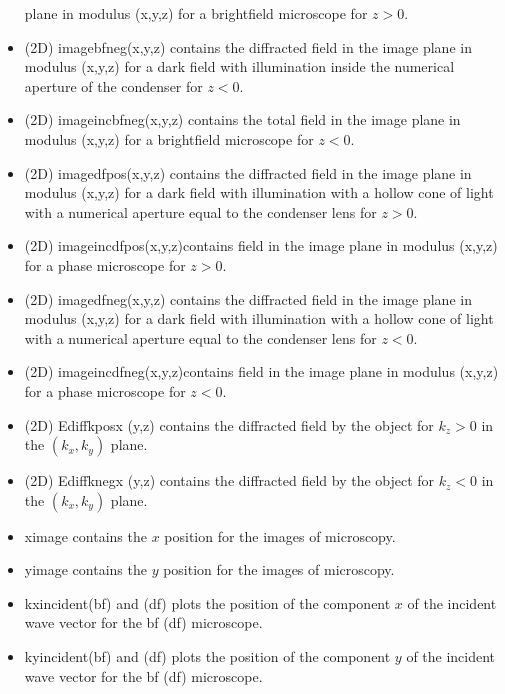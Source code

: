 \begin{itemize}
  plane in modulus (x,y,z) for a brightfield microscope for $z>0$.
\item (2D) imagebfneg(x,y,z) contains the diffracted field in the
  image plane in modulus (x,y,z) for a dark field with illumination
  inside the numerical aperture of the condenser for $z<0$.
\item (2D) imageincbfneg(x,y,z) contains the total field in the image
  plane in modulus (x,y,z) for a brightfield microscope for $z<0$.
\item (2D) imagedfpos(x,y,z) contains the diffracted field in the
  image plane in modulus (x,y,z) for a dark field with illumination
  with a hollow cone of light with a numerical aperture equal to the
  condenser lens for $z>0$.
\item (2D) imageincdfpos(x,y,z)contains field in the image plane in
  modulus (x,y,z) for a phase microscope for $z>0$.
\item (2D) imagedfneg(x,y,z) contains the diffracted field in the
  image plane in modulus (x,y,z) for a dark field with illumination
  with a hollow cone of light with a numerical aperture equal to the
  condenser lens for $z<0$.
\item (2D) imageincdfneg(x,y,z)contains field in the image plane in
  modulus (x,y,z) for a phase microscope for $z<0$.
\item (2D) Ediffkposx (y,z) contains the diffracted field by the
  object for $k_z>0$ in the $(k_x,k_y)$ plane.
\item (2D) Ediffknegx (y,z) contains the diffracted field by the
  object for $k_z<0$ in the $(k_x,k_y)$ plane.
\item ximage contains the $x$ position for the images of microscopy.
\item yimage contains the $y$ position for the images of microscopy. 
\item kxincident(bf) and (df) plots the position of the component $x$
  of the incident wave vector for the bf (df) microscope.
\item kyincident(bf) and (df) plots the position of the component $y$
  of the incident wave vector for the bf (df) microscope.

  
\end{itemize}

